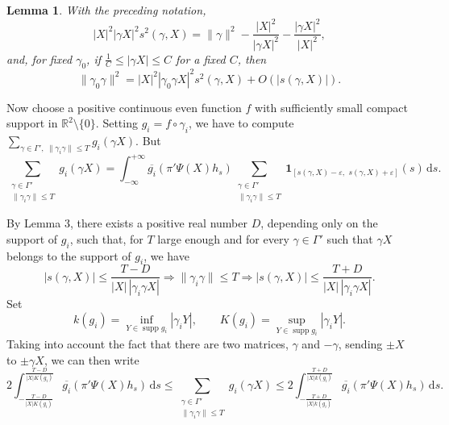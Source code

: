 \documentclass[11pt]{article}
\newtheorem{lemma}{Lemma}
\theoremstyle{remark}
\newcommand{\R}{\mathbb{R}}
\newcommand{\rd}{\mathrm{d}}
\newcommand{\supp}{\operatorname{supp}}
\begin{document}
\begin{lemma}
With the preceding notation,
\[
|X|^2|\gamma X|^2s^2(\gamma,X)
=\|\gamma\|^2-\frac{|X|^2}{|\gamma X|^2}-\frac{|\gamma X|^2}{|X|^2},
\]
and, for fixed $\gamma_0$, if $\frac1C\le |\gamma X|\le C$ for a fixed $C$, then
\[
\|\gamma_0\gamma\|^2=|X|^2|\gamma_0\gamma X|^2s^2(\gamma,X)+O(|s(\gamma,X)|).
\]
\end{lemma}

Now choose a positive continuous even function $f$ with sufficiently small compact support in $\R^2\setminus\{0\}$. Setting $g_i=f\circ\gamma_i$, we have to compute
$\sum_{\gamma\in\Gamma',\ \|\gamma_i\gamma\|\le T}g_i(\gamma X)$. But
\[
\sum_{\substack{\gamma\in\Gamma'\\ \|\gamma_i\gamma\|\le T}}g_i(\gamma X)
=\int_{-\infty}^{+\infty}\overline{g_i}(\pi'\Psi(X)h_s)
\sum_{\substack{\gamma\in\Gamma'\\ \|\gamma_i\gamma\|\le T}}
\mathbf 1_{[s(\gamma,X)-\varepsilon,\,\,s(\gamma,X)+\varepsilon]}(s)\,\rd s.
\]

By Lemma 3, there exists a positive real number $D$, depending only on the support of $g_i$, such that, for $T$ large enough and for every $\gamma\in\Gamma'$ such that $\gamma X$ belongs to the support of $g_i$, we have
\[
|s(\gamma,X)|\le\frac{T-D}{|X|\,|\gamma_i\gamma X|}
\Longrightarrow \|\gamma_i\gamma\|\le T
\Longrightarrow
|s(\gamma,X)|\le\frac{T+D}{|X|\,|\gamma_i\gamma X|}.
\]
Set
\[
k(g_i)=\inf_{Y\in\supp g_i}|\gamma_iY|,
\qquad
K(g_i)=\sup_{Y\in\supp g_i}|\gamma_iY|.
\]
Taking into account the fact that there are two matrices, $\gamma$ and $-\gamma$, sending $\pm X$ to $\pm\gamma X$, we can then write
\[
2\int_{-\frac{T-D}{|X|K(g_i)}}^{\frac{T-D}{|X|K(g_i)}}
\overline{g_i}(\pi'\Psi(X)h_s)\,\rd s
\le
\sum_{\substack{\gamma\in\Gamma'\\ \|\gamma_i\gamma\|\le T}}g_i(\gamma X)
\le
2\int_{-\frac{T+D}{|X|k(g_i)}}^{\frac{T+D}{|X|k(g_i)}}
\overline{g_i}(\pi'\Psi(X)h_s)\,\rd s.
\]
\end{document}
